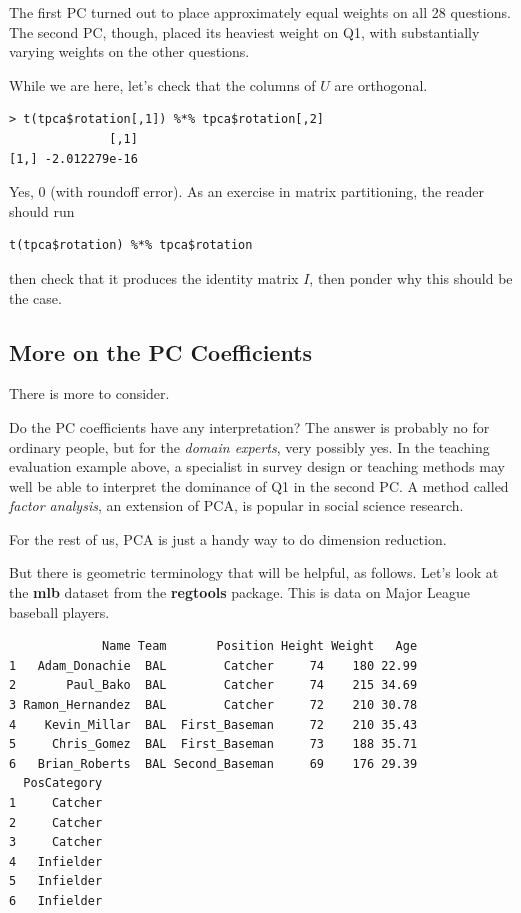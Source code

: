 The first PC turned out to place approximately equal weights on all 28
questions.  The second PC, though, placed its heaviest weight on Q1,
with substantially varying weights on the other questions.

While we are here, let's check that the columns of $U$ are orthogonal.

\begin{lstlisting}
> t(tpca$rotation[,1]) %*% tpca$rotation[,2]
              [,1]
[1,] -2.012279e-16
\end{lstlisting}

Yes, 0 (with roundoff error).  As an exercise in matrix partitioning,
the reader should run

\begin{lstlisting}
t(tpca$rotation) %*% tpca$rotation
\end{lstlisting}

then check that it produces the identity matrix $I$, then ponder why
this should be the case.

\subsection{More on the PC Coefficients}
\label{coors}

There is more to consider.

Do the PC coefficients have any interpretation?  The answer is
probably no for ordinary people, but for the \textit{domain experts},
very possibly yes.  In the teaching evaluation example above, a
specialist in survey design or teaching methods may well be able to
interpret the dominance of Q1 in the second PC.  A method called
\textit{factor analysis}, an extension of PCA, is popular in social
science research.

For the rest of us, PCA is just a handy way to do dimension reduction.

But there is geometric terminology that will be helpful, as follows.
Let's look at the \textbf{mlb} dataset from the \textbf{regtools}
package.  This is data on Major League baseball players.

\begin{lstlisting}
             Name Team       Position Height Weight   Age
1   Adam_Donachie  BAL        Catcher     74    180 22.99
2       Paul_Bako  BAL        Catcher     74    215 34.69
3 Ramon_Hernandez  BAL        Catcher     72    210 30.78
4    Kevin_Millar  BAL  First_Baseman     72    210 35.43
5     Chris_Gomez  BAL  First_Baseman     73    188 35.71
6   Brian_Roberts  BAL Second_Baseman     69    176 29.39
  PosCategory
1     Catcher
2     Catcher
3     Catcher
4   Infielder
5   Infielder
6   Infielder
\end{lstlisting}

